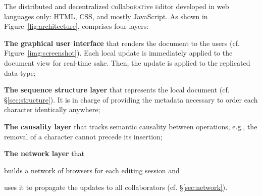 The distributed and decentralized \textsc{c}ollabo\textsc{rat}ive
\textsc{e}ditor \CRATE developed in web languages only: HTML, CSS, and mostly
JavaScript. As shown in Figure~\ref{fig:architecture}, \CRATE comprises four
layers:
\begin{asparadesc}
\item [\textbf{The graphical user interface}] that renders the document to the users
  (cf. Figure~\ref{img:screenshot}). Each local update is immediately applied to
  the document view for real-time sake. Then, the update is applied to the
  replicated data type;
\item [\textbf{The sequence structure layer}] that represents the local document
  (cf. §\ref{sec:structure}). It is in charge of providing the metadata
  necessary to order each character identically anywhere;
\item [\textbf{The causality layer}] that tracks semantic causality between operations,
  e.g., the removal of a character cannot precede its insertion;
\item [\textbf{The network layer}] that
  \begin{inparaenum}[(i)]
  \item builds a network of browsers for each editing session and
  \item uses it to propagate the updates to all collaborators
    (cf. §\ref{sec:network}).
  \end{inparaenum}
\end{asparadesc}



